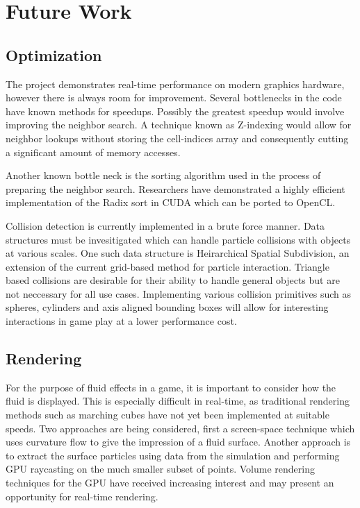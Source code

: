 \chapter{Future Work}

\section{Optimization}

The project demonstrates real-time performance on modern graphics hardware,
however there is always room for improvement. Several bottlenecks in the code
have known methods for speedups. Possibly the greatest speedup would involve
improving the neighbor search. A technique known as Z-indexing would allow for
neighbor lookups without storing the cell-indices array and consequently
cutting a significant amount of memory accesses.\cite{Goswami2010}


Another known bottle neck is the sorting algorithm used in the process of
preparing the neighbor search. Researchers have demonstrated a highly efficient
implementation of the Radix sort in CUDA\cite{Merrill:Sorting:2010} which can be ported to OpenCL.


Collision detection is currently implemented in a brute force manner. Data
structures must be invesitigated which can handle particle collisions with
objects at various scales. One such data structure is Heirarchical Spatial
Subdivision, an extension of the current grid-based method for particle
interaction.\cite{Pouchol2009} Triangle based collisions are desirable for
their ability to handle general objects but are not neccessary for all use
cases. Implementing various collision primitives such as spheres, cylinders and
axis aligned bounding boxes will allow for interesting interactions in game
play at a lower performance cost. 


\section{Rendering}
For the purpose of fluid effects in a game, it is important to consider how the
fluid is displayed. This is especially difficult in real-time, as traditional
rendering methods such as marching cubes have not yet been implemented at
suitable speeds.
Two approaches are being considered, first a screen-space technique which uses
curvature flow to give the impression of a fluid surface.\cite{VanderLaan2009}
Another approach is to extract the surface particles using data from the
simulation and performing GPU raycasting on the much smaller subset of
points.\cite{Goswami2010} Volume rendering techniques for the GPU have received
increasing interest and may present an opportunity for real-time
rendering.\cite{Fraedrich2010}


